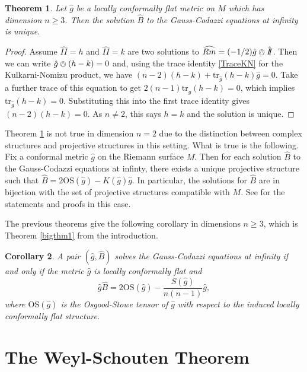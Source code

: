 \documentclass{amsart}
\newcommand{\two}{I\!\!I}
\newcommand{\tr}{\mathrm{tr}}
\newtheorem{thm}{Theorem}[section]
\newtheorem{cor}[thm]{Corollary}
\numberwithin{equation}{section}
\begin{document}
\begin{thm}
\label{Uniqueness}
Let $\hat{g}$ be a locally conformally flat metric on $M$ which has dimension $n \geq 3$.
Then the solution $\hat{B}$ to the Gauss-Codazzi equations at infinity is unique.
\end{thm}

\begin{proof}
Assume $\hat{\two} = h$ and $\hat{\two} = k$ are two solutions to $\widehat{Rm} = (-1/2)\hat{g}\owedge\hat{\two}$.
Then we can write $\hat{g}\owedge (h-k) = 0$ and, using the trace identity \eqref{TraceKN} for the Kulkarni-Nomizu product, we have $(n-2)(h-k) + \tr_{\hat{g}}(h-k)\hat{g} = 0$.
Take a further trace of this equation to get $2(n-1)\tr_{\hat{g}}(h-k) = 0$, which implies $\tr_{\hat{g}}(h-k) = 0$.
Substituting this into the first trace identity gives $(n-2)(h-k) = 0$. 
As $n \neq 2$, this says $h=k$ and the solution is unique.
\end{proof}

Theorem \ref{Uniqueness} is not true in dimension $n = 2$ due to the distinction between complex structures and projective structures in this setting.
What is true is the following.
Fix a conformal metric $\hat{g}$ on the Riemann surface $M$.
Then for each solution $\hat{B}$ to the Gauss-Codazzi equations at infinty, there exists a unique projective structure such that $\hat{B} = 2\mathrm{OS}(\hat{g}) - K(\hat{g})\hat{g}$.
In particular, the solutions for $\hat{B}$ are in bijection with the set of projective structures compatible with $M$.
See \cite{Bridgeman-Bromberg2022} for the statements and proofs in this case. 



The previous theorems give the following corollary in dimensions $n \geq 3$, which is Theorem \ref{bigthm1} from the introduction. 
\begin{cor}
\label{MainThm}
A pair $(\hat{g},\hat{B})$ solves the Gauss-Codazzi equations at infinity if and only if the metric $\hat{g}$ is locally conformally flat and
\[
\hat{g} \hat{B} = 2\mathrm{OS}(\hat{g}) - \frac{S(\hat{g})}{n(n-1)}\hat{g},
\]
where $\mathrm{OS}(\hat{g})$ is the Osgood-Stowe tensor of $\hat{g}$ with respect to the induced locally conformally flat structure.
\end{cor}


\section{The Weyl-Schouten Theorem}
\end{document}
